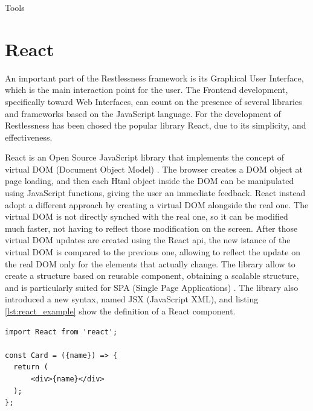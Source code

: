 \begin{chapter}{Tools}
    \section{React}
    An important part of the Restlessness framework is its Graphical User Interface,
    which is the main interaction point for the user. The Frontend development,
    specifically toward Web Interfaces, can count on the presence of several
    libraries and frameworks based on the JavaScript language. For the development
    of Restlessness has been chosed the popular library React, due to its simplicity,
    and effectiveness.

    React is an Open Source JavaScript library that implements the concept of
    virtual DOM (Document Object Model) \cite{dom_standard}. The browser creates
    a DOM object at page loading, and then each Html object inside the DOM can be
    manipulated using JavaScript functions, giving the user an immediate feedback.
    React instead adopt a different approach by creating a virtual DOM alongside
    the real one. The virtual DOM is not directly synched with the real one, so
    it can be modified much faster, not having to reflect those modification on
    the screen. After those virtual DOM updates are created using the React api,
    the new istance of the virtual DOM is compared to the previous one, allowing
    to reflect the update on the real DOM only for the elements that actually
    change. The library allow to create a structure based on reusable component,
    obtaining a scalable structure, and is particularly suited for SPA (Single
    Page Applications) \cite{react_js}.
    The library also introduced a new syntax, named JSX (JavaScript XML), and
    listing \ref{lst:react_example} show the definition of a React component.

    \bigskip
    \begin{lstlisting}[caption= React component definition,label={lst:react_example}]
import React from 'react';

const Card = ({name}) => {
  return (
      <div>{name}</div>
  );
};
    \end{lstlisting}

\end{chapter}